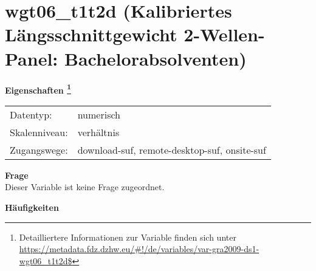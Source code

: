 
    \setcounter{footnote}{0}

    \vspace*{-1.8cm}
	\section{wgt06\_t1t2d (Kalibriertes Längsschnittgewicht 2-Wellen-Panel: Bachelorabsolventen)}
	\label{section:wgt06_t1t2d}



    \vspace*{0.5cm}
    \noindent\textbf{Eigenschaften
	\footnote{Detailliertere Informationen zur Variable finden sich unter
		\url{https://metadata.fdz.dzhw.eu/\#!/de/variables/var-gra2009-ds1-wgt06_t1t2d$}}}\\
	\begin{tabularx}{\hsize}{@{}lX}
	Datentyp: & numerisch \\
	Skalenniveau: & verhältnis \\
	Zugangswege: &
	  download-suf, 
	  remote-desktop-suf, 
	  onsite-suf
 \\
    \end{tabularx}



		\vspace*{0.5cm}
		\noindent\textbf{Frage}\\
		Dieser Variable ist keine Frage zugeordnet.





        		\vspace*{0.5cm}
                \noindent\textbf{Häufigkeiten}

